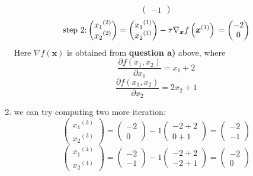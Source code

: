 \documentclass[12pt]{scrartcl}
\newcommand{\vect}[1]{\boldsymbol{#1}}
\newcommand{\ve}{\vect}
\begin{document}
\begin{enumerate}[label=\alph*)]
\begin{equation*}
\begin{pmatrix}
        -1
    \end{pmatrix}   
\end{equation*}
\begin{equation*}
\text{step 2:} 
    \begin{pmatrix}
        \displaystyle x{_1}^{(2)} \\
        \displaystyle x{_2}^{(2)}
    \end{pmatrix}
    =
    \begin{pmatrix}
        \displaystyle x{_1}^{(1)} \\
        \displaystyle x{_2}^{(1)}
    \end{pmatrix}
    -\tau \nabla_{\ve{x}} f\left(\ve{x}^{(1)}\right) \\
    =
    \begin{pmatrix}
        -2 \\
        0
    \end{pmatrix}   
\end{equation*}
Here $\nabla f\left(\ve{x}\right)$ is obtained from \textbf{question a)} above, where
\[\frac{\partial{f(x_1, x_2)}}{\partial{x_1}} = x_1 + 2\] 
\[\frac{\partial{f(x_1, x_2)}}{\partial{x_2}} = 2x_2 + 1\] 

\item
we can try computing two more iteration:
\begin{equation*}
    \begin{pmatrix}
        \displaystyle x{_1}^{(3)} \\
        \displaystyle x{_2}^{(3)}
    \end{pmatrix}
    =
    \begin{pmatrix}
        -2 \\
        0
    \end{pmatrix}
    -1
    \begin{pmatrix}
        -2+2 \\
        0+1
    \end{pmatrix}
    =
    \begin{pmatrix}
        -2 \\
        -1
    \end{pmatrix}   
\end{equation*}
\begin{equation*}
    \begin{pmatrix}
        \displaystyle x{_1}^{(4)} \\
        \displaystyle x{_2}^{(4)}
    \end{pmatrix}
    =
    \begin{pmatrix}
        -2 \\
        -1
    \end{pmatrix}
    -1
    \begin{pmatrix}
        -2+2 \\
        -2+1
    \end{pmatrix}
    =
    \begin{pmatrix}
        -2 \\
        0
    \end{pmatrix}   
\end{equation*}


\end{enumerate}
\end{document}
